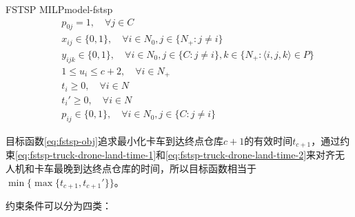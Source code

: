 {\begin{model}{FSTSP MILP}{model-fstsp}
\begin{align}
    \quad & p_{0j} = 1, \quad \forall j \in C\label{eq:fstsp-drone-start-order}\\
    \quad & x_{ij} \in \{0, 1\}, \quad \forall i \in N_0, j \in \{N_{+}:j \neq i\}\label{eq:fstsp-x-bound}\\
    \quad & y_{ijk} \in \{0, 1\}, \quad \forall i \in N_0, j \in \{C:j \neq i\}, k \in \{N_{+}:\langle i,j,k \rangle \in P\}\label{eq:fstsp-y-bound}\\
    \quad & 1 \leq u_i \leq c+2, \quad \forall i \in N_{+}\label{eq:fstsp-u-bound}\\
    \quad & t_i \geq 0, \quad \forall i \in N\label{eq:fstsp-truck-time-bound}\\
    \quad & t_i' \geq 0, \quad \forall i \in N\label{eq:fstsp-drone-time-bound}\\
    \quad & p_{ij}\in \{0, 1\}, \quad \forall i \in N_0, j \in \{C: j \neq i\}\label{eq:fstsp-drone-order-bound}
\end{align}
\end{model}
}

目标函数\ref{eq:fstsp-obj}追求最小化卡车到达终点仓库$c+1$的有效时间$t_{c+1}$，通过约束\ref{eq:fstsp-truck-drone-land-time-1}和\ref{eq:fstsp-truck-drone-land-time-2}来对齐无人机和卡车最晚到达终点仓库的时间，所以目标函数相当于$\min\{\max\{t_{c+1},t_{c+1}'\}\}$。

约束条件可以分为四类\cite{zhihu-murray2015}：

